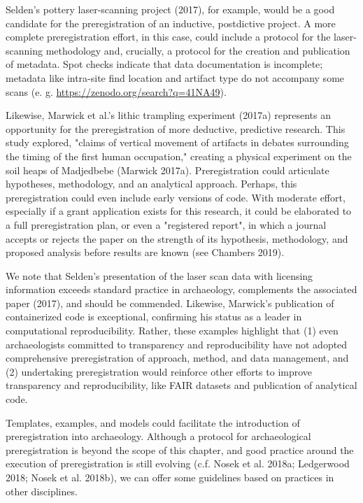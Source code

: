 \documentclass[article]{sa}
\begin{document}
Selden's pottery laser-scanning project (2017), for example, would be a
good candidate for the preregistration of an inductive, postdictive
project. A more complete preregistration effort, in this case, could
include a protocol for the laser-scanning methodology and, crucially, a
protocol for the creation and publication of metadata. Spot checks
indicate that data documentation is incomplete; metadata like intra-site
find location and artifact type do not accompany some scans (e. g.
\href{https://zenodo.org/search?page=1\&size=20\&q=41NA49}{{https://zenodo.org/search?q=41NA49}}).

Likewise, Marwick et al.'s lithic trampling experiment (2017a)
represents an opportunity for the preregistration of more deductive,
predictive research. This study explored, "claims of vertical movement
of artifacts in debates surrounding the timing of the first human
occupation," creating a physical experiment on the soil heaps of
Madjedbebe (Marwick 2017a). Preregistration could articulate hypotheses,
methodology, and an analytical approach. Perhaps, this preregistration
could even include early versions of code. With moderate effort,
especially if a grant application exists for this research, it could be
elaborated to a full preregistration plan, or even a "registered
report", in which a journal accepts or rejects the paper on the strength
of its hypothesis, methodology, and proposed analysis before results are
known (see Chambers 2019).

We note that Selden's presentation of the laser scan data with licensing
information exceeds standard practice in archaeology, complements the
associated paper (2017), and should be commended. Likewise, Marwick's
publication of containerized code is exceptional, confirming his status
as a leader in computational reproducibility. Rather, these examples
highlight that (1) even archaeologists committed to transparency and
reproducibility have not adopted comprehensive preregistration of
approach, method, and data management, and (2) undertaking
preregistration would reinforce other efforts to improve transparency
and reproducibility, like FAIR datasets and publication of analytical
code.

Templates, examples, and models could facilitate the introduction of
preregistration into archaeology. Although a protocol for archaeological
preregistration is beyond the scope of this chapter, and good practice
around the execution of preregistration is still evolving (c.f. Nosek et
al. 2018a; Ledgerwood 2018; Nosek et al. 2018b), we can offer some
guidelines based on practices in other disciplines.
\end{document}
